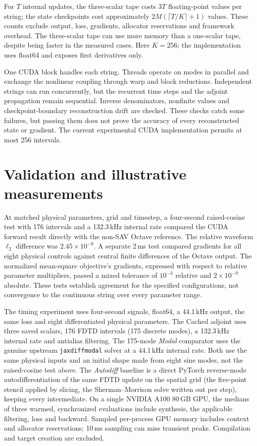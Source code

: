 \documentclass[a4paper,10pt]{article}
\begin{document}
For $T$ internal updates, the three-scalar tape costs $3T$ floating-point values per string; the state checkpoints cost approximately $2M(\lceil T/K\rceil+1)$ values. These counts exclude output, loss, gradients, allocator reservations and framework overhead. The three-scalar tape can use more memory than a one-scalar tape, despite being faster in the measured cases. Here $K=256$; the implementation uses float64 and exposes first derivatives only.

One CUDA block handles each string. Threads operate on modes in parallel and exchange the nonlinear coupling through warp and block reductions. Independent strings can run concurrently, but the recurrent time steps and the adjoint propagation remain sequential. Inverse denominators, nonfinite values and checkpoint-boundary reconstruction drift are checked. These checks catch some failures, but passing them does not prove the accuracy of every reconstructed state or gradient. The current experimental CUDA implementation permits at most 256 intervals.

\section{Validation and illustrative measurements}
At matched physical parameters, grid and timestep, a four-second raised-cosine test with 176 intervals and a 132.3\,kHz internal rate compared the CUDA forward result directly with the non-SAV Octave reference. The relative waveform $\ell_2$ difference was $2.45\times10^{-9}$. A separate 2\,ms test compared gradients for all eight physical controls against central finite differences of the Octave output. The normalized mean-square objective's gradients, expressed with respect to relative parameter multipliers, passed a mixed tolerance of $10^{-3}$ relative and $2\times10^{-9}$ absolute. These tests establish agreement for the specified configurations, not convergence to the continuous string over every parameter range.

The timing experiment uses four-second signals, float64, a 44.1\,kHz output, the same loss and eight differentiated physical parameters. The Cached adjoint uses three saved scalars, 176 FDTD intervals (175 discrete modes), a 132.3\,kHz internal rate and antialias filtering. The 175-mode \emph{Modal} comparator uses the genuine upstream \texttt{jaxdiffmodal} solver at a 44.1\,kHz internal rate. Both use the same physical inputs and an initial shape made from eight sine modes, not the raised-cosine test above. The \emph{Autodiff} baseline is a direct PyTorch reverse-mode autodifferentiation of the same FDTD update on the spatial grid (the five-point stencil applied by slicing, the Sherman--Morrison solve written out per step), keeping every intermediate. On a single NVIDIA A100 80\,GB GPU, the medians of three warmed, synchronized evaluations include synthesis, the applicable filtering, loss and backward. Sampled per-process GPU memory includes context and allocator reservations; 10\,ms sampling can miss transient peaks. Compilation and target creation are excluded.
\end{document}
